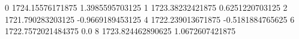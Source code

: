 0 1724.15576171875 1.3985595703125
1 1723.38232421875 0.6251220703125
2 1721.790283203125 -0.9669189453125
4 1722.239013671875 -0.5181884765625
6 1722.7572021484375 0.0
8 1723.824462890625 1.0672607421875
